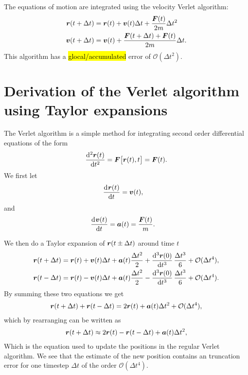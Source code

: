 The equations of motion are integrated using the velocity Verlet algorithm:
\begin{align*}
    \boldsymbol{r}(t + \Delta t) &= \boldsymbol{r}(t) + \boldsymbol{v}(t)\Delta t + \frac{\boldsymbol{F}(t)}{2m}\Delta t^2 \\
    \boldsymbol{v}(t + \Delta t) &= \boldsymbol{v}(t) + \frac{\boldsymbol{F}(t + \Delta t) + \boldsymbol{F}(t)}{2m}\Delta t.
\end{align*}
This algorithm has a \hl{glocal/accumulated} error of $\mathcal{O}(\Delta t^2)$.

\section{Derivation of the Verlet algorithm using Taylor expansions}
The Verlet algorithm\cite{verlet1967computer} is a simple method for integrating second order differential equations of the form 
\begin{align*}
    \dod[2]{\rvec(t)}{t} = \Fvec\big[\rvec(t), t\big] = \Fvec(t).
\end{align*}
We first let
\begin{align*}
    \dod{\rvec(t)}{t} &= \vvec(t),
\end{align*}
and
\begin{align*}
    \dod{\vvec(t)}{t} &= \avec(t) = \frac{\Fvec(t)}{m}.
\end{align*}

We then do a Taylor expansion of $\boldsymbol{r}(t \pm \Delta t)$ around time $t$
\begin{align}
    \rvec(t + \Delta t) &= \rvec(t) + \vvec(t)\Delta t + \avec(t)\frac{\Delta t^2}{2} + \dod[3]{\rvec(0)}{t}\frac{\Delta t^3}{6} + \mathcal{O}(\Delta t^4), \label{eq:verlet_plus}\\
    \rvec(t - \Delta t) &= \rvec(t) - \vvec(t)\Delta t + \avec(t)\frac{\Delta t^2}{2} - \dod[3]{\rvec(0)}{t}\frac{\Delta t^3}{6} + \mathcal{O}(\Delta t^4).\label{eq:verlet_minus}
\end{align}
By summing these two equations we get
\begin{align*}
    \boldsymbol{r}(t + \Delta t) + \boldsymbol{r}(t - \Delta t) = 2\boldsymbol{r}(t) + \boldsymbol{a}(t)\Delta t^2 + \mathcal{O}(\Delta t^4),
\end{align*}
which by rearranging can be written as
\begin{align*}
    \boldsymbol{r}(t + \Delta t) \approx 2\boldsymbol{r}(t) - \boldsymbol{r}(t - \Delta t) + \boldsymbol{a}(t)\Delta t^2,
\end{align*}
Which is the equation used to update the positions in the regular Verlet algorithm. We see that the estimate of the new position contains an truncation error for one timestep $\Delta t$ of the order $\mathcal{O}(\Delta t^4)$.

